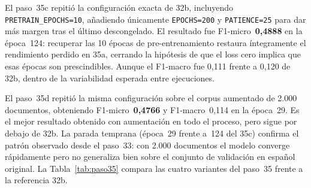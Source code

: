 \begin{sloppypar}
El paso~35c repitió la configuración exacta de 32b, incluyendo \texttt{PRETRAIN\_EPOCHS=10}, añadiendo únicamente \texttt{EPOCHS=200} y \texttt{PATIENCE=25} para dar más margen tras el último descongelado. El resultado fue F1-micro~\textbf{0,4888} en la época~124: recuperar las 10 épocas de pre-entrenamiento restaura íntegramente el rendimiento perdido en 35a, cerrando la hipótesis de que el loss cero implica que esas épocas son prescindibles. Aunque el F1-macro fue 0,111 frente a 0,120 de 32b, dentro de la variabilidad esperada entre ejecuciones.
\end{sloppypar}

El paso~35d repitió la misma configuración sobre el corpus aumentado de 2.000 documentos, obteniendo F1-micro~\textbf{0,4766} y F1-macro~0,114 en la época~29. Es el mejor resultado obtenido con aumentación en todo el proceso, pero sigue por debajo de 32b. La parada temprana (época~29 frente a~124 del 35c) confirma el patrón observado desde el paso~33: con 2.000 documentos el modelo converge rápidamente pero no generaliza bien sobre el conjunto de validación en español original. La Tabla~\ref{tab:paso35} compara las cuatro variantes del paso~35 frente a la referencia 32b.

